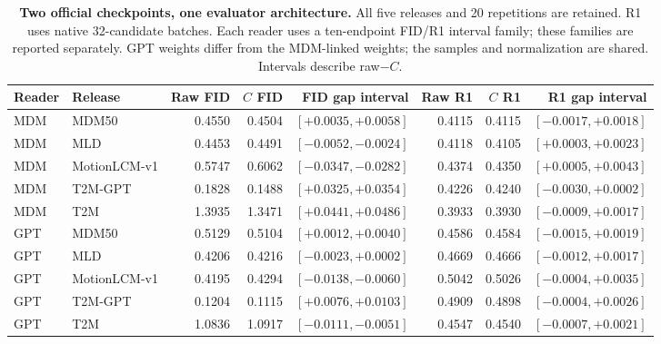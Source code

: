 \begin{table}[t]
\centering\footnotesize
\caption{\textbf{Two official checkpoints, one evaluator architecture.} All five releases and 20 repetitions are retained. R1 uses native 32-candidate batches. Each reader uses a ten-endpoint FID/R1 interval family; these families are reported separately. GPT weights differ from the MDM-linked weights; the samples and normalization are shared. Intervals describe raw$-C$.}
\label{tab:releasereaders}
\begin{tabular}{llrrrrrr}\toprule
Reader&Release&Raw FID&$C$ FID&FID gap interval&Raw R1&$C$ R1&R1 gap interval\\\midrule
MDM&MDM50&0.4550&0.4504&$[+0.0035,+0.0058]$&0.4115&0.4115&$[-0.0017,+0.0018]$\\
MDM&MLD&0.4453&0.4491&$[-0.0052,-0.0024]$&0.4118&0.4105&$[+0.0003,+0.0023]$\\
MDM&MotionLCM-v1&0.5747&0.6062&$[-0.0347,-0.0282]$&0.4374&0.4350&$[+0.0005,+0.0043]$\\
MDM&T2M-GPT&0.1828&0.1488&$[+0.0325,+0.0354]$&0.4226&0.4240&$[-0.0030,+0.0002]$\\
MDM&T2M&1.3935&1.3471&$[+0.0441,+0.0486]$&0.3933&0.3930&$[-0.0009,+0.0017]$\\
GPT&MDM50&0.5129&0.5104&$[+0.0012,+0.0040]$&0.4586&0.4584&$[-0.0015,+0.0019]$\\
GPT&MLD&0.4206&0.4216&$[-0.0023,+0.0002]$&0.4669&0.4666&$[-0.0012,+0.0017]$\\
GPT&MotionLCM-v1&0.4195&0.4294&$[-0.0138,-0.0060]$&0.5042&0.5026&$[-0.0004,+0.0035]$\\
GPT&T2M-GPT&0.1204&0.1115&$[+0.0076,+0.0103]$&0.4909&0.4898&$[-0.0004,+0.0026]$\\
GPT&T2M&1.0836&1.0917&$[-0.0111,-0.0051]$&0.4547&0.4540&$[-0.0007,+0.0021]$\\
\bottomrule\end{tabular}\end{table}
